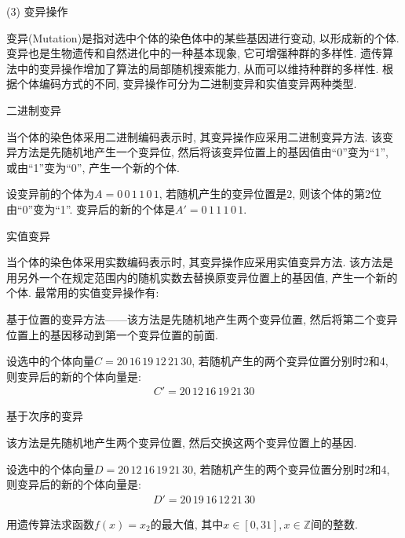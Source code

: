 {\begin{example}
\end{example}

 (3) 变异操作

 变异(Mutation)是指对选中个体的染色体中的某些基因进行变动, 以形成新的个体. 变异也是生物遗传和自然进化中的一种基本现象, 它可增强种群的多样性. 遗传算法中的变异操作增加了算法的局部随机搜索能力, 从而可以维持种群的多样性. 根据个体编码方式的不同, 变异操作可分为二进制变异和实值变异两种类型.

  二进制变异

 当个体的染色体采用二进制编码表示时, 其变异操作应采用二进制变异方法. 该变异方法是先随机地产生一个变异位, 然后将该变异位置上的基因值由“0”变为“1”, 或由“1”变为“0”, 产生一个新的个体.

\begin{example}
设变异前的个体为$A=0\, 0 \, 1\,  1\,  0 \, 1$, 若随机产生的变异位置是2, 则该个体的第2位由“0”变为“1”.
变异后的新的个体是$A'= 0\,  1\,  1\,  1\,  0 \, 1$.
\end{example}

 实值变异

 当个体的染色体采用实数编码表示时, 其变异操作应采用实值变异方法. 该方法是用另外一个在规定范围内的随机实数去替换原变异位置上的基因值, 产生一个新的个体. 最常用的实值变异操作有:

 基于位置的变异方法——该方法是先随机地产生两个变异位置, 然后将第二个变异位置上的基因移动到第一个变异位置的前面.

\begin{example}
设选中的个体向量$C=20\,  16\,  19\,  12\,  21\,  30$, 若随机产生的两个变异位置分别时2和4, 则变异后的新的个体向量是:
\begin{align}
    C'= 20\,  12 \, 16 \, 19\,  21\,  30
\end{align}
\end{example}

基于次序的变异

该方法是先随机地产生两个变异位置, 然后交换这两个变异位置上的基因.

\begin{example}
    设选中的个体向量$D=20\,  12 \, 16 \, 19\,  21\,  30$, 若随机产生的两个变异位置分别时2和4, 则变异后的新的个体向量是:
\begin{align}
  D'= 20\,  19\,  16\,  12 \, 21 \, 30
\end{align}
\end{example}

\begin{example}
    用遗传算法求函数$f(x)=x_2$的最大值, 其中$x\in [0,31],x\in \mathbb Z$间的整数.
\end{example}

}

